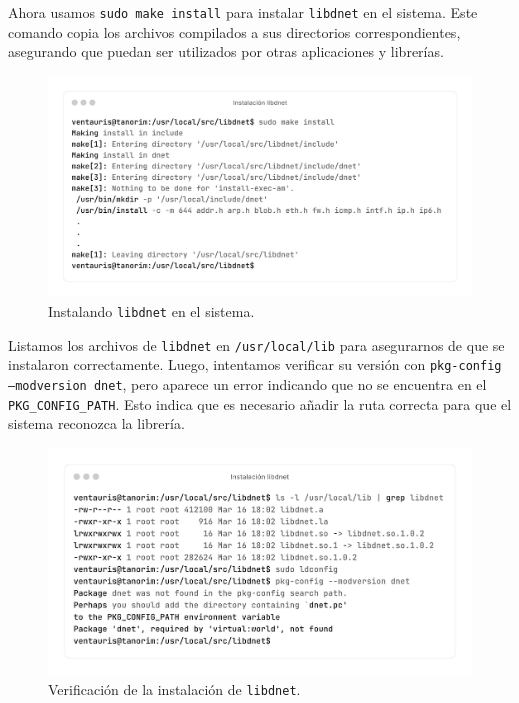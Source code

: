 \documentclass[11pt,a4paper,twoside]{report}
\begin{document}
\newpage

Ahora usamos \texttt{sudo make install} para instalar \texttt{libdnet} en el sistema. Este comando copia los archivos compilados a sus directorios correspondientes, asegurando que puedan ser utilizados por otras aplicaciones y librerías.

\begin{figure}[H]
	\centering
	\includegraphics[scale=0.12]{instalacion_snort/5-5.png}
	\caption{Instalando \texttt{libdnet} en el sistema.}
\end{figure}

Listamos los archivos de \texttt{libdnet} en \texttt{/usr/local/lib} para asegurarnos de que se instalaron correctamente. Luego, intentamos verificar su versión con \texttt{pkg-config --modversion dnet}, pero aparece un error indicando que no se encuentra en el \texttt{PKG\_CONFIG\_PATH}. Esto indica que es necesario añadir la ruta correcta para que el sistema reconozca la librería.

\begin{figure}[H]
	\centering
	\includegraphics[scale=0.12]{instalacion_snort/6-6.png}
	\caption{Verificación de la instalación de \texttt{libdnet}.}
\end{figure}
\end{document}
